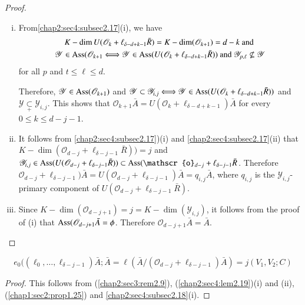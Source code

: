 \begin{proof}%
\begin{enumerate}[(i)]
\item From\pageoriginale \ref{chap2:sec4:subsec2.17}(i), we have 
  \begin{multline*}
  K - \dim
  U(\mathscr{O}_k+\ell_{\delta-d+k-1}\bar{R}) = K- \dim
  (\mathscr{O}_{k+1}) = d-k ~\text{and}~\\
  \mathscr{Y}\in \operatorname{Ass}(\mathscr{O}_{k+1} \Longleftrightarrow
  \mathscr{Y}\in  \operatorname{Ass}
  (U(\mathscr{O}_{k}+\ell_{\delta-d+k-1}\bar{R})) ~\text{and}~
  \mathscr{Y}_{p,\ell} \nsubseteq\mathscr{Y}
  \end{multline*}
  for all $p$ {and}  $t\leq  \ell \leq d$. 

  Therefore, $\mathscr{Y}\in \operatorname{Ass}(\mathscr{O}_{k+1})$ and
  $\mathscr{Y}\subset\mathscr{Y}_{i,j}
  \Longleftrightarrow\mathscr{Y}\in  \operatorname{Ass}
  (U(\mathscr{O}_{k}+\ell_{\delta-d+k-1}\bar{R})) $ and $
  \mathscr{Y}\underset{+}{\subset}\mathscr{Y}_{i,j}$. This shows that
  $\mathscr{O}_{k+1}\bar{A} =
  U(\mathscr{O}_{k}+\ell_{\delta-d+k-1})\bar{A}$ for every $0\leq k
  \leq d-j-1$. 
\item It follows from \ref{chap2:sec4:subsec2.17})(i) and
  \ref{chap2:sec4:subsec2.17}(ii) that $K-\dim
  (\mathscr{O}_{d-j}+ \ell_{\delta-j-1}\bar{R}))=j$ and
  $\mathscr{Y}_{i,j} \in  \ass(U(\mathscr{O}_{d-j}+\ell_{\delta
  -j-1}\bar{R})) \subset \ass
  (\mathscr{o}_{d-j}+\ell_{\delta-j-1}\bar{R}$. Therefore
  $\mathscr{O}_{d-j}+\ell_{\delta-j-1})\bar{A} =
  U(\mathscr{O}_{d-j}+\ell_{\delta-j-1})\bar{A}= q_{i,j}\bar{A}$,
  where $q_{i,j}$ is the $\mathscr{Y}_{i,j}$-primary component of
  $U(\mathscr{O}_{d-j}+\ell_{\delta-j-1}\bar{R})$. 
\item Since $K-\dim (\mathscr{O}_{d-j+1}) = j = K - \dim
  (\mathscr{Y}_{i,j})$, it follows from the proof of (i) that
  $\operatorname{Ass}(\mathscr{O}_{d-j+1}\bar{A} = \phi$. Therefore
  $\mathscr{O}_{d-j+1}\bar{A} = \bar{A}$. 
\end{enumerate}
\end{proof}

\setcounter{corollary}{19}
\begin{corollary}\label{chap2:sec4:coro2.20}
  $$
  e_0((\ell_0,\ldots,\ell_{\delta-j-1}) \bar{A};\bar{A} = \ell(\bar{A}/
  (\mathscr{O}_{d-j}+\ell_{\delta-j-1})\bar{A}) = j(V_1,V_2;C) 
  $$
\end{corollary}

\begin{proof}%
  This follows from (\ref{chap2:sec3:rem2.9}),
  (\ref{chap2:sec4:lem2.19})(i) and (ii), (\ref{chap1:sec2:prop1.25})
  and \ref{chap2:sec4:subsec2.18}(i). 
\end{proof}

